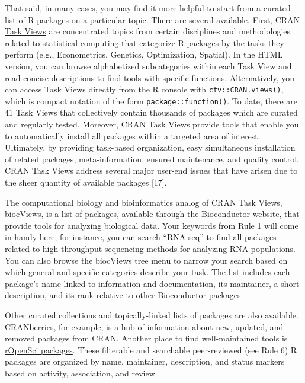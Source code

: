 \documentclass[10pt,letterpaper]{article}
\begin{document}
That said, in many cases, you may find it more helpful to start from a
curated list of R packages on a particular topic. There are several
available. First, \href{https://cran.r-project.org/web/views/}{CRAN Task
Views} are concentrated topics from certain disciplines and
methodologies related to statistical computing that categorize R
packages by the tasks they perform (e.g., Econometrics, Genetics,
Optimization, Spatial). In the HTML version, you can browse alphabetized
subcategories within each Task View and read concise descriptions to
find tools with specific functions. Alternatively, you can access Task
Views directly from the R console with \texttt{ctv::CRAN.views()}, which
is compact notation of the form \texttt{package::function()}. To date,
there are 41 Task Views that collectively contain thousands of packages
which are curated and regularly tested. Moreover, CRAN Task Views
provide tools that enable you to automatically install all packages
within a targeted area of interest. Ultimately, by providing task-based
organization, easy simultaneous installation of related packages,
meta-information, ensured maintenance, and quality control, CRAN Task
Views address several major user-end issues that have arisen due to the
sheer quantity of available packages {[}17{]}.

The computational biology and bioinformatics analog of CRAN Task Views,
\href{https://www.bioconductor.org/packages/release/BiocViews.html\#___Software}{biocViews},
is a list of packages, available through the Bioconductor website, that
provide tools for analyzing biological data. Your keywords from Rule 1
will come in handy here; for instance, you can search ``RNA-seq'' to
find all packages related to high-throughput sequencing methods for
analyzing RNA populations. You can also browse the biocViews tree menu
to narrow your search based on which general and specific categories
describe your task. The list includes each package's name linked to
information and documentation, its maintainer, a short description, and
its rank relative to other Bioconductor packages.

Other curated collections and topically-linked lists of packages are
also available.
\href{http://dirk.eddelbuettel.com/cranberries/index.html}{CRANberries},
for example, is a hub of information about new, updated, and removed
packages from CRAN. Another place to find well-maintained tools is
\href{https://ropensci.org/packages/}{rOpenSci packages}. These
filterable and searchable peer-reviewed (see Rule 6) R packages are
organized by name, maintainer, description, and status markers based on
activity, association, and review.
\end{document}
